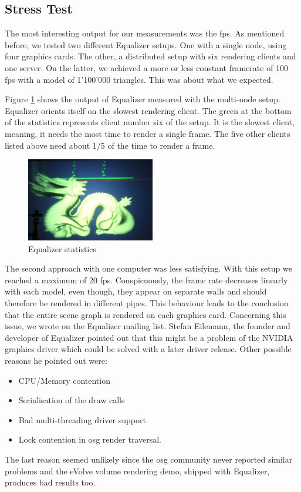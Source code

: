 \subsection{Stress Test}
The most interesting output for our measurements was the \gls{fps}. As mentioned before, we tested two different Equalizer setups. One with a single node, using four graphics cards. The other, a distributed setup with six rendering clients and one server. On the latter, we achieved a more or less constant framerate of 100 \gls{fps} with a model of 1'100'000 triangles. This was about what we expected.

Figure \ref{fig:eq_stats} shows the output of Equalizer measured with the multi-node setup. Equalizer orients itself on the slowest rendering client. The green at the bottom of the statistics represents client number six of the setup. It is the slowest client, meaning, it needs the most time to render a single frame. The five other clients listed above need about 1/5 of the time to render a frame.

\begin{figure}[H]
	\centering
	\includegraphics[width=0.5\textwidth]{../figures/fotos/eqStats}
	\caption{Equalizer statistics}
	\label{fig:eq_stats}
\end{figure}
	
The second approach with one computer was less satisfying. With this setup we reached a maximum of 20 \gls{fps}. Conspicuously, the frame rate decreases linearly with each model, even though, they appear on separate walls and should therefore be rendered in different pipes. This behaviour leads to the conclusion that the entire scene graph is rendered on each graphics card. Concerning this issue, we wrote on the Equalizer mailing list. Stefan Eilemann, the founder and developer of Equalizer pointed out that this might be a problem of the NVIDIA graphics driver which could be solved with a later driver release. Other possible reasons he pointed out were:

\begin{itemize}
	\item CPU/Memory contention
	\item Serialisation of the draw calls
	\item Bad multi-threading driver support
	\item Lock contention in \gls{osg} render traversal.
\end{itemize}

The last reason seemed unlikely since the \gls{osg} community never reported similar problems and the eVolve volume rendering demo, shipped with Equalizer, produces bad results too.
